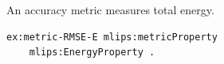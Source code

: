 An accuracy metric measures total energy.
\begin{lstlisting}[language=turtle]
ex:metric-RMSE-E mlips:metricProperty
    mlips:EnergyProperty .
\end{lstlisting}

